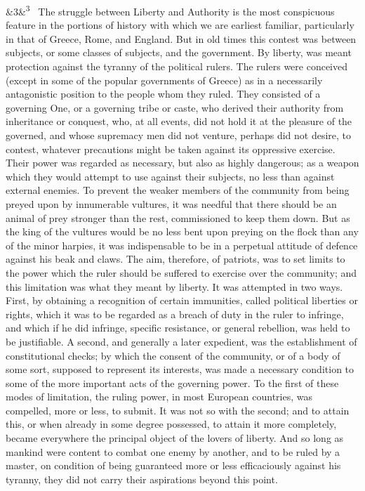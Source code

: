 \documentclass[12pt]{article}
\newcommand{\para}[1][]{\par\noindent\ifx&#1&\else\textsuperscript{\footnotesize #1}~\fi}
\begin{document}
\para[3] The struggle between Liberty and Authority is the most conspicuous feature in the portions of history with which we are earliest familiar, particularly in that of Greece, Rome, and England. But in old times this contest was between subjects, or some classes of subjects, and the government. By liberty, was meant protection against the tyranny of the political rulers. The rulers were conceived (except in some of the popular governments of Greece) as in a necessarily antagonistic position to the people whom they ruled. They consisted of a governing One, or a governing tribe or caste, who derived their authority from inheritance or conquest, who, at all events, did not hold it at the pleasure of the governed, and whose supremacy men did not venture, perhaps did not desire, to contest, whatever precautions might be taken against its oppressive exercise. Their power was regarded as necessary, but also as highly dangerous; as a weapon which they would attempt to use against their subjects, no less than against external enemies. To prevent the weaker members of the community from being preyed upon by innumerable vultures, it was needful that there should be an animal of prey stronger than the rest, commissioned to keep them down. But as the king of the vultures would be no less bent upon preying on the flock than any of the minor harpies, it was indispensable to be in a perpetual attitude of defence against his beak and claws. The aim, therefore, of patriots, was to set limits to the power which the ruler should be suffered to exercise over the community; and this limitation was what they meant by liberty. It was attempted in two ways. First, by obtaining a recognition of certain immunities, called political liberties or rights, which it was to be regarded as a breach of duty in the ruler to infringe, and which if he did infringe, specific resistance, or general rebellion, was held to be justifiable. A second, and generally a later expedient, was the establishment of constitutional checks; by which the consent of the community, or of a body of some sort, supposed to represent its interests, was made a necessary condition to some of the more important acts of the governing power. To the first of these modes of limitation, the ruling power, in most European countries, was compelled, more or less, to submit. It was not so with the second; and to attain this, or when already in some degree possessed, to attain it more completely, became everywhere the principal object of the lovers of liberty. And so long as mankind were content to combat one enemy by another, and to be ruled by a master, on condition of being guaranteed more or less efficaciously against his tyranny, they did not carry their aspirations beyond this point.
\end{document}
